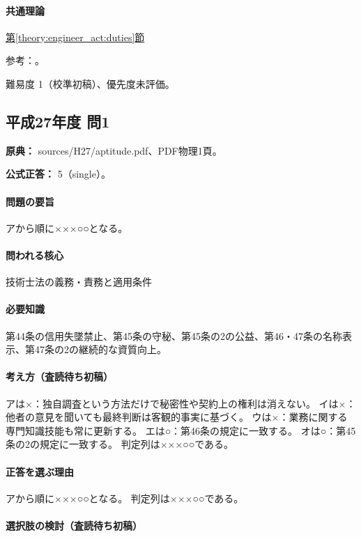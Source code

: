 \paragraph{共通理論} \hyperref[theory:engineer_act:duties]{第\ref*{theory:engineer_act:duties}節}

\par 参考：\cite{engineer_act_current}。

\par 難易度 1（校準初稿）、優先度未評価。

\subsection{平成27年度 問1}
\label{q:h27-reg-apt-01}

\noindent\textbf{原典：} sources/H27/aptitude.pdf、PDF物理1頁。

\textbf{公式正答：} 5（single）。

\paragraph{問題の要旨} アから順に×××○○となる。

\paragraph{問われる核心} 技術士法の義務・責務と適用条件

\paragraph{必要知識} 第44条の信用失墜禁止、第45条の守秘、第45条の2の公益、第46・47条の名称表示、第47条の2の継続的な資質向上。

\paragraph{考え方（査読待ち初稿）} アは×：独自調査という方法だけで秘密性や契約上の権利は消えない。 イは×：他者の意見を聞いても最終判断は客観的事実に基づく。 ウは×：業務に関する専門知識技能も常に更新する。 エは○：第46条の規定に一致する。 オは○：第45条の2の規定に一致する。 判定列は×××○○である。

\paragraph{正答を選ぶ理由} アから順に×××○○となる。  判定列は×××○○である。

\paragraph{選択肢の検討（査読待ち初稿）}\mbox{}\par


